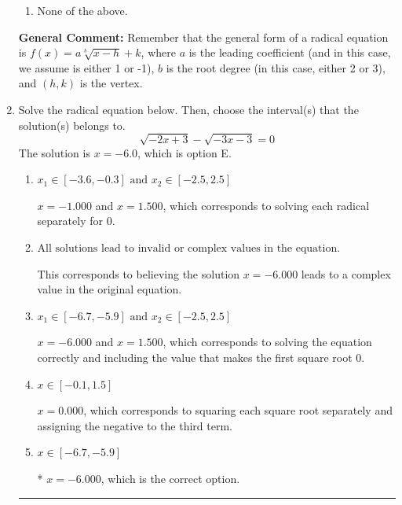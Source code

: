\documentclass{extbook}[14pt]
\newcommand{\litem}[1]{\item #1

\rule{\textwidth}{0.4pt}}
\begin{document}
\begin{enumerate}
{\begin{enumerate}[label=\Alph*.]
\begin{multicols}{2}
\end{multicols}\item None of the above.\end{enumerate}
\textbf{General Comment:} Remember that the general form of a radical equation is $ f(x) = a \sqrt[b]{x - h} + k $, where $a$ is the leading coefficient (and in this case, we assume is either 1 or -1), $b$ is the root degree (in this case, either 2 or 3), and $(h, k)$ is the vertex.
}
\litem{
Solve the radical equation below. Then, choose the interval(s) that the solution(s) belongs to.
\[ \sqrt{-2 x + 3} - \sqrt{-3 x - 3} = 0 \]
The solution is \( x = -6.0 \), which is option E.\begin{enumerate}[label=\Alph*.]
\item \( x_1 \in [-3.6, -0.3] \text{ and } x_2 \in [-2.5,2.5] \)

$x = -1.000$ and $x = 1.500$, which corresponds to solving each radical separately for 0.
\item \( \text{All solutions lead to invalid or complex values in the equation.} \)

This corresponds to believing the solution $x = -6.000$ leads to a complex value in the original equation.
\item \( x_1 \in [-6.7, -5.9] \text{ and } x_2 \in [-2.5,2.5] \)

$x = -6.000$ and $x = 1.500$, which corresponds to solving the equation correctly and including the value that makes the first square root 0.
\item \( x \in [-0.1,1.5] \)

$x = 0.000$, which corresponds to squaring each square root separately and assigning the negative to the third term.
\item \( x \in [-6.7,-5.9] \)

* $x = -6.000$, which is the correct option.
\end{enumerate}

}
\end{enumerate}
\end{document}
